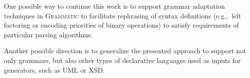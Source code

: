 \documentclass{IOS-Book-Article}     %
\newcommand{\tool}[1]{\textsc{#1}}
\newcommand{\Grammatic}[0]{\tool{Grammatic}}
\begin{document}
One possible way to continue this work is to support grammar adaptation techniques \cite{Laemmel} in \Grammatic{} to facilitate rephrasing of syntax definitions (e.g.,~left factoring or encoding priorities of binary operations) to satisfy requirements of particular parsing algorithms.

Another possible direction is to generalize the presented approach to support not only grammars, but also other types of declarative languages used as inputs for generators, such as UML or XSD.





\end{document}
